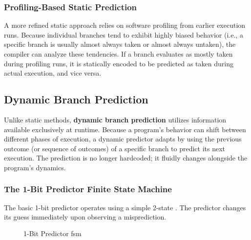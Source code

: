 \subsubsection*{Profiling-Based Static Prediction}
A more refined static approach relies on software profiling from earlier execution runs. Because individual branches tend to exhibit highly biased behavior (i.e., a specific branch is usually almost always taken or almost always untaken), the compiler can analyze these tendencies. If a branch evaluates as mostly taken during profiling runs, it is statically encoded to be predicted as taken during actual execution, and vice versa.

\subsection{Dynamic Branch Prediction}

Unlike static methods, \textbf{dynamic branch prediction} utilizes information available exclusively at runtime. Because a program's behavior can shift between different phases of execution, a dynamic predictor adapts by using the previous outcome (or sequence of outcomes) of a specific branch to predict its next execution. The prediction is no longer hardcoded; it fluidly changes alongside the program's dynamics.

\subsubsection{The 1-Bit Predictor Finite State Machine}
The basic 1-bit predictor operates using a simple 2-state . The predictor changes its guess immediately upon observing a misprediction.

\begin{figure}[htpb]
    \centering
    \caption{1-Bit Predictor \gls{fsm}}
    \label{fig:1bit-fsm}
\end{figure}

